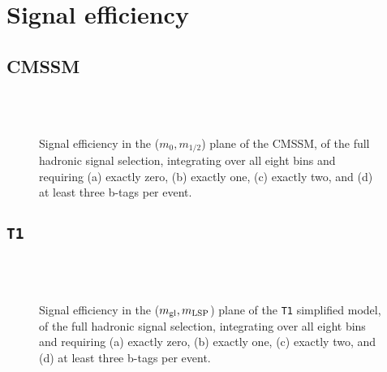 \newpage
\chapter{Signal efficiency\label{app:sig-eff}}

\section{CMSSM\label{app:sig-eff-cmssm}}

\begin{figure}[h!]
  \begin{center}
     \\
     \\
    \caption{\label{fig:sig-eff-cmssm}Signal efficiency in the
      ($m_{0},m_{1/2}$) plane of the CMSSM, of the full hadronic
      signal selection, integrating over all eight \HT bins and
      requiring (a) exactly zero, (b) exactly one, (c) exactly two,
      and (d) at least three b-tags per event.}
  \end{center}
\end{figure}

\newpage
\section{\texttt{T1}\label{app:sig-eff-t1}}

\begin{figure}[h!]
  \begin{center}
     \\
     \\
    \caption{\label{fig:sig-eff-t1}Signal efficiency in the ($m_{\rm
        gl},m_{\rm LSP}$) plane of the \texttt{T1} simplified model,
      of the full hadronic signal selection, integrating over all
      eight \HT bins and requiring (a) exactly zero, (b) exactly
      one, (c) exactly two, and (d) at least three b-tags per event.}
  \end{center}
\end{figure}

